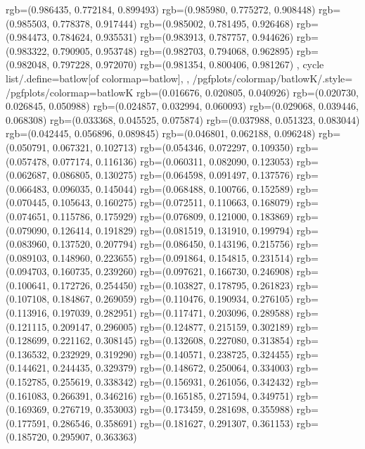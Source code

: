 {{{					rgb=(0.986435, 0.772184, 0.899493)
					rgb=(0.985980, 0.775272, 0.908448)
					rgb=(0.985503, 0.778378, 0.917444)
					rgb=(0.985002, 0.781495, 0.926468)
					rgb=(0.984473, 0.784624, 0.935531)
					rgb=(0.983913, 0.787757, 0.944626)
					rgb=(0.983322, 0.790905, 0.953748)
					rgb=(0.982703, 0.794068, 0.962895)
					rgb=(0.982048, 0.797228, 0.972070)
					rgb=(0.981354, 0.800406, 0.981267)
			},
		cycle list/.define={batlow}{[of colormap=batlow]},
		},
		/pgfplots/colormap/batlowK/.style={
			/pgfplots/colormap={batlowK}{%
					rgb=(0.016676, 0.020805, 0.040926)
					rgb=(0.020730, 0.026845, 0.050988)
					rgb=(0.024857, 0.032994, 0.060093)
					rgb=(0.029068, 0.039446, 0.068308)
					rgb=(0.033368, 0.045525, 0.075874)
					rgb=(0.037988, 0.051323, 0.083044)
					rgb=(0.042445, 0.056896, 0.089845)
					rgb=(0.046801, 0.062188, 0.096248)
					rgb=(0.050791, 0.067321, 0.102713)
					rgb=(0.054346, 0.072297, 0.109350)
					rgb=(0.057478, 0.077174, 0.116136)
					rgb=(0.060311, 0.082090, 0.123053)
					rgb=(0.062687, 0.086805, 0.130275)
					rgb=(0.064598, 0.091497, 0.137576)
					rgb=(0.066483, 0.096035, 0.145044)
					rgb=(0.068488, 0.100766, 0.152589)
					rgb=(0.070445, 0.105643, 0.160275)
					rgb=(0.072511, 0.110663, 0.168079)
					rgb=(0.074651, 0.115786, 0.175929)
					rgb=(0.076809, 0.121000, 0.183869)
					rgb=(0.079090, 0.126414, 0.191829)
					rgb=(0.081519, 0.131910, 0.199794)
					rgb=(0.083960, 0.137520, 0.207794)
					rgb=(0.086450, 0.143196, 0.215756)
					rgb=(0.089103, 0.148960, 0.223655)
					rgb=(0.091864, 0.154815, 0.231514)
					rgb=(0.094703, 0.160735, 0.239260)
					rgb=(0.097621, 0.166730, 0.246908)
					rgb=(0.100641, 0.172726, 0.254450)
					rgb=(0.103827, 0.178795, 0.261823)
					rgb=(0.107108, 0.184867, 0.269059)
					rgb=(0.110476, 0.190934, 0.276105)
					rgb=(0.113916, 0.197039, 0.282951)
					rgb=(0.117471, 0.203096, 0.289588)
					rgb=(0.121115, 0.209147, 0.296005)
					rgb=(0.124877, 0.215159, 0.302189)
					rgb=(0.128699, 0.221162, 0.308145)
					rgb=(0.132608, 0.227080, 0.313854)
					rgb=(0.136532, 0.232929, 0.319290)
					rgb=(0.140571, 0.238725, 0.324455)
					rgb=(0.144621, 0.244435, 0.329379)
					rgb=(0.148672, 0.250064, 0.334003)
					rgb=(0.152785, 0.255619, 0.338342)
					rgb=(0.156931, 0.261056, 0.342432)
					rgb=(0.161083, 0.266391, 0.346216)
					rgb=(0.165185, 0.271594, 0.349751)
					rgb=(0.169369, 0.276719, 0.353003)
					rgb=(0.173459, 0.281698, 0.355988)
					rgb=(0.177591, 0.286546, 0.358691)
					rgb=(0.181627, 0.291307, 0.361153)
					rgb=(0.185720, 0.295907, 0.363363)
}}}
